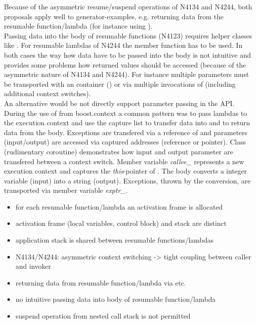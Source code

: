 Because of the asymmetric resume/suspend operations of N4134 and N4244, both
proposals apply well to generator-examples, e.g. returning data from the
resumable function/lambda (for instance using \yield).\\
Passing data into the body of resumable functions (N4123) requires helper
classes like \channel.
For resumable lambdas of N4244 the member function \rlwanted has to be used.
In both cases the way how data have to be passed into the body is not intuitive
and provides some problems how returned values should be accessed (because of
the asymmetric nature of N4134 and N4244). For instance multiple parameters must
be transported with an container (\tuple) or via multiple invocations of
\rlwanted (including additional context switches).\\
\newline
An alternative would be not directly support parameter passing in the API.\\
During the use of  from boost.context\cite{bcontext} a
common pattern was to pass lambdas to the execution context and use the capture
list to transfer data into and to return data from the body. Exceptions are
transfered via a reference of \excpt and parameters (input/output) are accessed
via captured addresses (reference or pointer).
Class  (rudimentary coroutine) demonstrates how input and output
parameter are transfered between a context switch. Member variable
\textit{callee\_} represents a new execution context and captures the
\textit{this}-pointer of . The body converts a integer variable (input)
into a string (output). Exceptions, thrown by the conversion, are transported
via member variable \textit{exptr\_}.

\begin{itemize}
    \item   for each resumable function/lambda an activation frame is allocated
    \item   activation frame (local variables, control block) and stack are
            distinct
    \item   application stack is shared between resumable functions/lambdas
    \item   N4134/N4244: asymmetric context switching -> tight coupling between
            caller and invoker
    \item   returning data from resumable function/lambda via \yield etc.
    \item   no intuitive passing data into body of resumable function/lambda
    \item   suspend operation from nested call stack is not permitted
\end{itemize}

